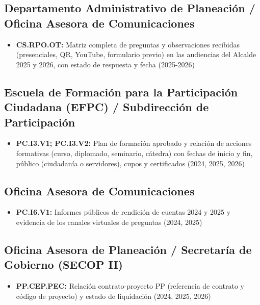 \documentclass[11pt,letterpaper]{article}
\begin{document}
\subsection*{Departamento Administrativo de Planeación / Oficina Asesora de Comunicaciones}

\begin{itemize}

\item \textbf{CS.RPO.OT:} Matriz completa de preguntas y observaciones recibidas (presenciales, QR, YouTube, formulario previo) en las audiencias del Alcalde 2025 y 2026, con estado de respuesta y fecha (2025-2026)

\end{itemize}

\subsection*{Escuela de Formación para la Participación Ciudadana (EFPC) / Subdirección de Participación}

\begin{itemize}

\item \textbf{PC.I3.V1; PC.I3.V2:} Plan de formación aprobado y relación de acciones formativas (curso, diplomado, seminario, cátedra) con fechas de inicio y fin, público (ciudadanía o servidores), cupos y certificados (2024, 2025, 2026)

\end{itemize}

\subsection*{Oficina Asesora de Comunicaciones}

\begin{itemize}

\item \textbf{PC.I6.V1:} Informes públicos de rendición de cuentas 2024 y 2025 y evidencia de los canales virtuales de preguntas (2024, 2025)

\end{itemize}

\subsection*{Oficina Asesora de Planeación / Secretaría de Gobierno (SECOP II)}

\begin{itemize}

\item \textbf{PP.CEP.PEC:} Relación contrato-proyecto PP (referencia de contrato y código de proyecto) y estado de liquidación (2024, 2025, 2026)

\end{itemize}
\end{document}

